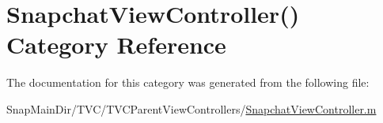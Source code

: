\hypertarget{category_snapchat_view_controller_07_08}{}\section{Snapchat\+View\+Controller() Category Reference}
\label{category_snapchat_view_controller_07_08}


The documentation for this category was generated from the following file\+:\begin{DoxyCompactItemize}
\item 
Snap\+Main\+Dir/\+T\+V\+C/\+T\+V\+C\+Parent\+View\+Controllers/\hyperlink{_snapchat_view_controller_8m}{Snapchat\+View\+Controller.\+m}\end{DoxyCompactItemize}

